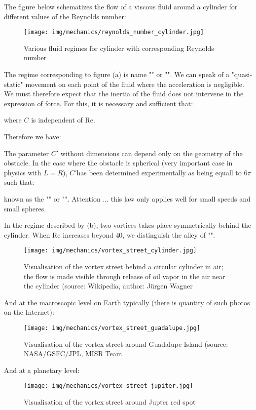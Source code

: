 	The figure below schematizes the flow of a viscous fluid around a cylinder for different values of the Reynolds number:
	\begin{figure}[H]
		\centering
		\texttt{[image: img/mechanics/reynolds\_number\_cylinder.jpg]}
		\caption{Various fluid regimes for cylinder with corresponding Reynolds number}
	\end{figure}
	The regime corresponding to figure (a) is name "" or "". We can speak of a "quasi-static" movement on each point of the fluid where the acceleration is negligible. We must therefore expect that the inertia of the fluid does not intervene in the expression of force. For this, it is necessary and sufficient that:
	
	where $C$ is independent of Re.

	Therefore we have:
	
	The parameter $C'$ without dimensions can depend only on the geometry of the obstacle. In the case where the obstacle is spherical (very important case in physics with $L = R$), $C'$has been determined experimentally as being equall to $6\pi$ such that:
	
	known as the "" or "". Attention ... this law only applies well for small speeds and small spheres.

	In the regime described by (b), two vortices takes place symmetrically behind the cylinder. When Re increases beyond $40$, we distinguish the alley of "".
	\begin{figure}[H]
		\centering
		\texttt{[image: img/mechanics/vortex\_street\_cylinder.jpg]}
		\caption{Visualisation of the vortex street behind a circular cylinder in air; the flow is made visible through release of oil vapor in the air near the cylinder (source: Wikipedia, author: Jürgen Wagner}
	\end{figure}
	And at the macroscopic level on Earth typically (there is quantity of such photos on the Internet):
	\begin{figure}[H]
		\centering
		\texttt{[image: img/mechanics/vortex\_street\_guadalupe.jpg]}
		\caption{Visualisation of the vortex street around Guadalupe Island (source: NASA/GSFC/JPL, MISR Team}
	\end{figure}
	And at a planetary level:
	\begin{figure}[H]
		\centering
		\texttt{[image: img/mechanics/vortex\_street\_jupiter.jpg]}
		\caption{Visualisation of the vortex street around Jupter red spot}
	\end{figure}
	
